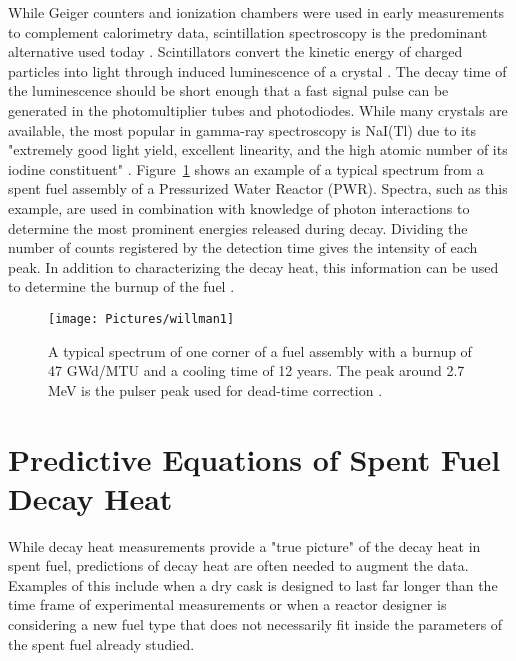 \documentclass{anstrans}
\begin{document}
While Geiger counters and ionization chambers were used in early measurements to complement calorimetry data, scintillation spectroscopy is the predominant alternative used today \cite{Tobi1980}. Scintillators convert the kinetic energy of charged particles into light through induced luminescence of a crystal \cite{Knol2000}. The decay time of the luminescence should be short enough that a fast signal pulse can be generated in the photomultiplier tubes and photodiodes. While many crystals are available, the most popular in gamma-ray spectroscopy is NaI(Tl) due to its "extremely good light yield, excellent linearity, and the high atomic number of its iodine constituent" \cite{Knol2000}. Figure~\ref{fig:will1} shows an example of a typical spectrum from a spent fuel assembly of a Pressurized Water Reactor (PWR). Spectra, such as this example, are used in combination with knowledge of photon interactions to determine the most prominent energies released during decay. Dividing the number of counts registered by the detection time gives the intensity of each peak. In addition to characterizing the decay heat, this information can be used to determine the burnup of the fuel \cite{Will2006}. 
\begin{figure}[ht]
 \centering
 \texttt{[image: Pictures/willman1]}
 \caption{A typical spectrum of one corner of a fuel assembly with a burnup of 47 GWd/MTU and a cooling time of 12 years. The peak around 2.7 MeV is the pulser peak used for dead-time correction \cite{Will2006}.}
 \label{fig:will1}
\end{figure}

\section{Predictive Equations of Spent Fuel Decay Heat}
While decay heat measurements provide a "true picture" of the decay heat in spent fuel, predictions of decay heat are often needed to augment the data. Examples of this include when a dry cask is designed to last far longer than the time frame of experimental measurements or when a reactor designer is considering a new fuel type that does not necessarily fit inside the parameters of the spent fuel already studied. 
\end{document}
